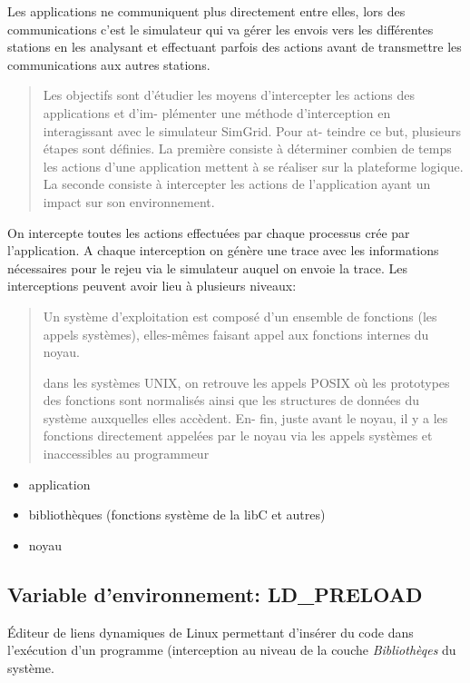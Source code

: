 \documentclass{article}
\begin{document}
Les applications ne communiquent plus directement entre elles, lors des
communications c'est le simulateur qui va gérer les envois vers les différentes
stations en les analysant et effectuant parfois des actions avant de transmettre
les communications aux autres stations.

\begin{quotation}
Les objectifs sont d’étudier les moyens d’intercepter les actions des
applications et d’im- plémenter une méthode d’interception en interagissant avec
le simulateur SimGrid. Pour at- teindre ce but, plusieurs étapes sont
définies. La première consiste à déterminer combien de temps les actions d’une
application mettent à se réaliser sur la plateforme logique. La seconde consiste
à intercepter les actions de l’application ayant un impact sur son
environnement.
\end{quotation}
On intercepte toutes les actions effectuées par chaque processus crée par
l'application. A chaque interception on génère une trace avec les informations
nécessaires pour le rejeu via le simulateur auquel on envoie la trace. Les
interceptions peuvent avoir lieu à plusieurs niveaux:

\begin{quotation}
{\color{green} Un système d’exploitation est composé d’un ensemble de fonctions
  (les appels systèmes), elles-mêmes faisant appel aux fonctions internes du
  noyau.

dans les systèmes UNIX, on retrouve les appels POSIX où les prototypes des
fonctions sont normalisés ainsi que les structures de données du système
auxquelles elles accèdent. En- fin, juste avant le noyau, il y a les fonctions
directement appelées par le noyau via les appels systèmes et inaccessibles au
programmeur }
\end{quotation}

\begin{itemize}
\item application
\item bibliothèques (fonctions système de la libC et autres)
\item noyau
\end{itemize}

\subsection{Variable d'environnement: LD\_PRELOAD}
Éditeur de liens dynamiques de Linux permettant d'insérer du code dans
l'exécution d'un programme (interception au niveau de la couche
\textit{Bibliothèqes} du système.
\end{document}
